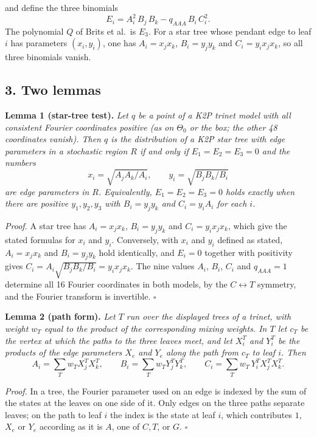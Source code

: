 \documentclass[
  11pt,
]{article}
\begin{document}
and define the three binomials
\[E_i = A_i^2\,B_j\,B_k - q_{AAA}\,B_i\,C_i^2 .\] The polynomial \(Q\)
of Brits et al.~is \(E_3\). For a star tree whose pendant edge to leaf
\(i\) has parameters \((x_i,y_i)\), one has \(A_i = x_jx_k\),
\(B_i = y_jy_k\) and \(C_i = y_ix_jx_k\), so all three binomials vanish.

\subsection{3. Two lemmas}\label{two-lemmas}

\textbf{Lemma 1 (star-tree test).} \emph{Let \(q\) be a point of a K2P
trinet model with all consistent Fourier coordinates positive (as on
\(\Theta_0\) or the box; the other 48 coordinates vanish). Then \(q\) is
the distribution of a K2P star tree with edge parameters in a stochastic
region \(R\) if and only if \(E_1=E_2=E_3=0\) and the numbers}
\[x_i = \sqrt{A_jA_k/A_i},\qquad y_i = \sqrt{B_jB_k/B_i}\] \emph{are
edge parameters in \(R\). Equivalently, \(E_1=E_2=E_3=0\) holds exactly
when there are positive \(y_1,y_2,y_3\) with \(B_i = y_jy_k\) and
\(C_i = y_iA_i\) for each \(i\).}

\emph{Proof.} A star tree has \(A_i=x_jx_k\), \(B_i=y_jy_k\) and
\(C_i=y_ix_jx_k\), which give the stated formulas for \(x_i\) and
\(y_i\). Conversely, with \(x_i\) and \(y_i\) defined as stated,
\(A_i=x_jx_k\) and \(B_i=y_jy_k\) hold identically, and \(E_i=0\)
together with positivity gives
\(C_i = A_i\sqrt{B_jB_k/B_i} = y_ix_jx_k\). The nine values \(A_i\),
\(B_i\), \(C_i\) and \(q_{AAA}=1\) determine all 16 Fourier coordinates
in both models, by the \(C\leftrightarrow T\) symmetry, and the Fourier
transform is invertible. \(\square\)

\textbf{Lemma 2 (path form).} \emph{Let \(T\) run over the displayed
trees of a trinet, with weight \(w_T\) equal to the product of the
corresponding mixing weights. In \(T\) let \(c_T\) be the vertex at
which the paths to the three leaves meet, and let \(X_i^T\) and
\(Y_i^T\) be the products of the edge parameters \(X_e\) and \(Y_e\)
along the path from \(c_T\) to leaf \(i\). Then}
\[A_i = \sum_T w_T X_j^TX_k^T,\qquad B_i=\sum_T w_T Y_j^TY_k^T,\qquad C_i=\sum_T w_T\,Y_i^T X_j^TX_k^T .\]

\emph{Proof.} In a tree, the Fourier parameter used on an edge is
indexed by the sum of the states at the leaves on one side of it. Only
edges on the three paths separate leaves; on the path to leaf \(i\) the
index is the state at leaf \(i\), which contributes \(1\), \(X_e\) or
\(Y_e\) according as it is \(A\), one of \(C,T\), or \(G\). \(\square\)
\end{document}
